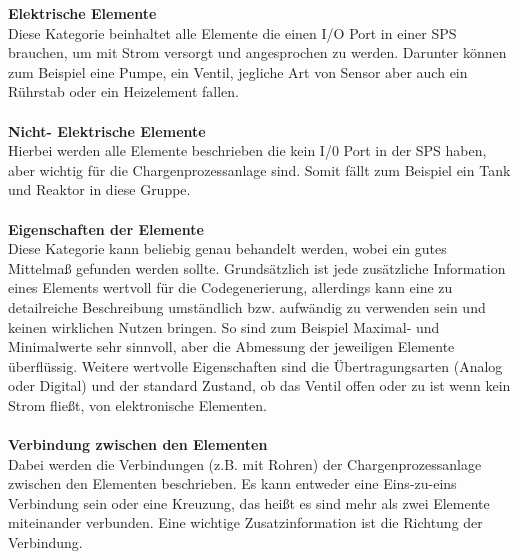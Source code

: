 \textbf{Elektrische Elemente}\\
Diese Kategorie beinhaltet alle Elemente die einen I/O Port in einer SPS brauchen, um mit Strom versorgt und angesprochen zu werden. Darunter können zum Beispiel eine Pumpe, ein Ventil, jegliche Art von Sensor aber auch ein Rührstab oder ein Heizelement fallen. \\\\
\textbf{Nicht- Elektrische Elemente}\\
Hierbei werden alle Elemente beschrieben die kein I/0 Port in der SPS haben, aber wichtig für die Chargenprozessanlage sind. Somit fällt zum Beispiel ein Tank und Reaktor in diese Gruppe.\\\\
\textbf{Eigenschaften der Elemente}  \\
Diese Kategorie kann beliebig genau behandelt werden, wobei ein gutes Mittelmaß gefunden werden sollte. Grundsätzlich ist jede zusätzliche Information eines Elements wertvoll für die Codegenerierung, allerdings kann eine zu detailreiche Beschreibung umständlich bzw. aufwändig zu verwenden sein und keinen wirklichen Nutzen bringen.
So sind zum Beispiel Maximal- und Minimalwerte sehr sinnvoll, aber die Abmessung der jeweiligen Elemente überflüssig. Weitere wertvolle Eigenschaften sind die Übertragungsarten (Analog oder Digital) und der standard Zustand, ob das Ventil offen oder zu ist wenn kein Strom fließt, von elektronische Elementen.   \\\\
\textbf{Verbindung zwischen den Elementen}  \\
Dabei werden die Verbindungen (z.B. mit Rohren) der Chargenprozessanlage zwischen den Elementen beschrieben. 
Es kann entweder eine Eins-zu-eins Verbindung sein oder eine Kreuzung, das heißt es sind mehr als zwei Elemente miteinander verbunden. Eine wichtige Zusatzinformation ist die Richtung der Verbindung.



